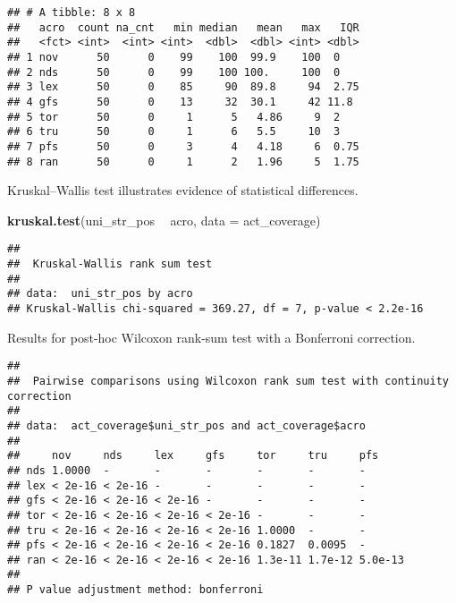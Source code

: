 \documentclass[]{book}
\newenvironment{Shaded}{\begin{snugshade}}{\end{snugshade}}
\newcommand{\DataTypeTok}[1]{\textcolor[rgb]{0.13,0.29,0.53}{#1}}
\newcommand{\KeywordTok}[1]{\textcolor[rgb]{0.13,0.29,0.53}{\textbf{#1}}}
\newcommand{\NormalTok}[1]{#1}
\newcommand{\OperatorTok}[1]{\textcolor[rgb]{0.81,0.36,0.00}{\textbf{#1}}}
\newcommand{\OtherTok}[1]{\textcolor[rgb]{0.56,0.35,0.01}{#1}}
\newcommand{\StringTok}[1]{\textcolor[rgb]{0.31,0.60,0.02}{#1}}
\begin{document}
\begin{verbatim}
## # A tibble: 8 x 8
##   acro  count na_cnt   min median   mean   max   IQR
##   <fct> <int>  <int> <int>  <dbl>  <dbl> <int> <dbl>
## 1 nov      50      0    99    100  99.9    100  0   
## 2 nds      50      0    99    100 100.     100  0   
## 3 lex      50      0    85     90  89.8     94  2.75
## 4 gfs      50      0    13     32  30.1     42 11.8 
## 5 tor      50      0     1      5   4.86     9  2   
## 6 tru      50      0     1      6   5.5     10  3   
## 7 pfs      50      0     3      4   4.18     6  0.75
## 8 ran      50      0     1      2   1.96     5  1.75
\end{verbatim}

Kruskal--Wallis test illustrates evidence of statistical differences.

\begin{Shaded}
\begin{Highlighting}[]
\KeywordTok{kruskal.test}\NormalTok{(uni_str_pos }\OperatorTok{~}\StringTok{ }\NormalTok{acro, }\DataTypeTok{data =}\NormalTok{ act_coverage)}
\end{Highlighting}
\end{Shaded}

\begin{verbatim}
## 
##  Kruskal-Wallis rank sum test
## 
## data:  uni_str_pos by acro
## Kruskal-Wallis chi-squared = 369.27, df = 7, p-value < 2.2e-16
\end{verbatim}

Results for post-hoc Wilcoxon rank-sum test with a Bonferroni correction.

\begin{Shaded}
\end{Shaded}

\begin{verbatim}
## 
##  Pairwise comparisons using Wilcoxon rank sum test with continuity correction 
## 
## data:  act_coverage$uni_str_pos and act_coverage$acro 
## 
##     nov     nds     lex     gfs     tor     tru     pfs    
## nds 1.0000  -       -       -       -       -       -      
## lex < 2e-16 < 2e-16 -       -       -       -       -      
## gfs < 2e-16 < 2e-16 < 2e-16 -       -       -       -      
## tor < 2e-16 < 2e-16 < 2e-16 < 2e-16 -       -       -      
## tru < 2e-16 < 2e-16 < 2e-16 < 2e-16 1.0000  -       -      
## pfs < 2e-16 < 2e-16 < 2e-16 < 2e-16 0.1827  0.0095  -      
## ran < 2e-16 < 2e-16 < 2e-16 < 2e-16 1.3e-11 1.7e-12 5.0e-13
## 
## P value adjustment method: bonferroni
\end{verbatim}
\end{document}
